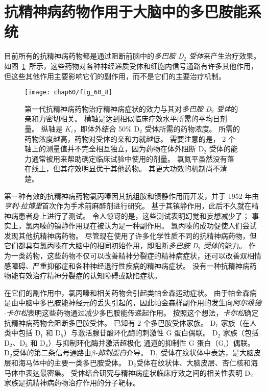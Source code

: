 \section{抗精神病药物作用于大脑中的多巴胺能系统}

目前所有的抗精神病药物都是通过阻断前脑中的\textit{多巴胺 D$_2$ 受体}来产生治疗效果。
如图~\ref{fig:60_8}~所示，这些药物对各种神经递质受体和细胞内信号通路有许多其他作用，但这些其他作用主要影响它们的副作用，而不是它们的主要治疗机制。


\begin{figure}[htbp]
	\centering
	\texttt{[image: chap60/fig\_60\_8]}
	\caption{第一代抗精神病药物治疗精神病症状的效力与其对\textit{多巴胺 D$_2$ 受体}的亲和力密切相关。
		横轴是达到相似临床疗效水平所需的平均日剂量。
		纵轴是 $ K_i $，即体外结合 50\% D$_2$ 受体所需的药物浓度。
		所需的药物浓度越高，药物对受体的亲和力就越低。
		需要注意的是， 2 个轴上的测量值并不完全相互独立，因为药物在体外阻断 D$_2$ 受体的能力通常被用来帮助确定临床试验中使用的剂量。
		氯氮平虽然没有落在线上，但其疗效明显优于其他药物。
		其更大功效的机制尚不清楚\cite{seeman1976antipsychotic}。}
	\label{fig:60_8}
\end{figure}


第一种有效的抗精神病药物氯丙嗪因其抗组胺和镇静作用而开发，并于 1952 年由\textit{亨利$\cdot$拉博里}首次作为手术前麻醉剂进行研究。
基于其镇静作用，此后不久就在精神病患者身上进行了测试。
令人惊讶的是，这些测试表明幻觉和妄想减少了；
事实上，氯丙嗪的镇静作用现在被认为是一种副作用。
氯丙嗪的成功促使人们尝试发现其他抗精神病药物。
尽管现在使用了许多化学性质不同的抗精神病药物，但它们都具有氯丙嗪在大脑中的相同初始作用，即阻断\textit{多巴胺 D$_2$ 受体}的能力。
作为一类药物，这些药物不仅可以改善精神分裂症的精神病症状，还可以改善双相情感障碍、严重抑郁症和各种神经退行性疾病的精神病症状。
没有一种抗精神病药物能有效治疗精神分裂症的认知障碍或缺陷症状。


在它们的副作用中，氯丙嗪和相关药物会引起类帕金森运动症状。
由于帕金森病是由中脑中多巴胺能神经元的丢失引起的，因此帕金森样副作用的发生向\textit{阿尔维德$\cdot$卡尔松}表明这些药物通过减少多巴胺能传递起作用。
按照这个想法，\textit{卡尔松}确定抗精神病药物会阻断多巴胺受体。
已知有 2 个多巴胺受体家族。
D$_1$ 家族（在人类中包括 D$_1$ 和 D$_5$）与激活腺苷酸环化酶的刺激性 G 蛋白偶联。
D$_2$ 家族（包括 D$_2$、D$_3$ 和 D$_4$）与抑制环化酶并激活超极化  通道的抑制性 G 蛋白（G$_i $）偶联。
D$_2$受体的第二条信号通路由\textit{$\beta$-抑制蛋白}介导。
D$_1$ 受体在纹状体中表达，是大脑皮层和海马体中的主要一类多巴胺受体。
D$_2$受体在纹状体、大脑皮层、杏仁核和海马体中表达最密集。
受体结合研究与精神病症状临床疗效之间的相关性表明 D$_2$ 家族是抗精神病药物治疗作用的分子靶标。


